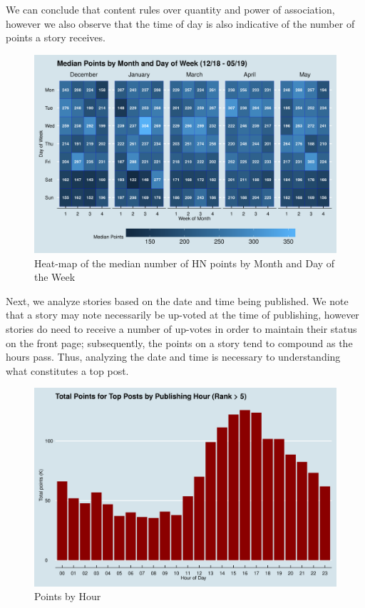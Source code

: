 \documentclass[11pt,journal,final,a4paper]{IEEEtran}
\begin{document}
We can conclude that content rules over quantity and power of association, however we also observe that the time of day is also indicative of the number of points a story receives. 
\begin{figure}[!ht]
\centerline{\includegraphics[scale=0.4]{img/descriptive_06_dayofweek.png}}
\caption{Heat-map of the median number of HN points by Month and Day of the Week}
\label{fig6}
\end{figure}

Next, we analyze stories based on the date and time being published. We note that a story may note necessarily be up-voted at the time of publishing, however stories do need to receive a number of up-votes in order to maintain their status on the front page; subsequently, the points on a story tend to compound as the hours pass. Thus, analyzing the date and time is necessary to understanding what constitutes a top post. 

\begin{figure}[!ht]
\centerline{\includegraphics[scale=0.4]{img/descriptive_07_pointsbyhour.png}}
\caption{Points by Hour}
\label{fig7}
\end{figure}
\end{document}
